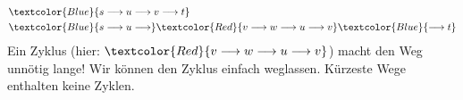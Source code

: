 \begin{myexercise}
\begin{myanswer}
\begin{figure}[H]
\end{figure}
    \begin{align*}
        &\textcolor{Blue}{s \longrightarrow u \longrightarrow v \longrightarrow t} \\
        &\textcolor{Blue}{s \longrightarrow u \longrightarrow} \textcolor{Red}{ v \longrightarrow w \longrightarrow u \longrightarrow v} \textcolor{Blue}{\longrightarrow  t}\\
    \end{align*}
Ein Zyklus (hier: $\textcolor{Red}{ v \longrightarrow w \longrightarrow u \longrightarrow v}$) macht den Weg unnötig lange! Wir können den Zyklus einfach weglassen. Kürzeste Wege enthalten keine Zyklen.
\end{myanswer}
\end{myexercise}





\clearpage


